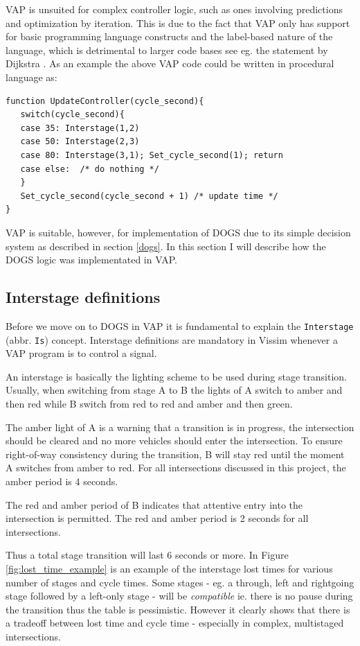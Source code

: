VAP is unsuited for complex controller logic, such as ones involving predictions and optimization by iteration. This is due to the fact that VAP only has support for basic programming language constructs and the label-based nature of the language, which is detrimental to larger code bases see eg. the statement by Dijkstra \cite{nogoto}. As an example the above VAP code could be written in procedural language as:

\begin{verbatim}
function UpdateController(cycle_second){
   switch(cycle_second){
   case 35: Interstage(1,2)
   case 50: Interstage(2,3)
   case 80: Interstage(3,1); Set_cycle_second(1); return
   case else:  /* do nothing */
   }
   Set_cycle_second(cycle_second + 1) /* update time */
}
\end{verbatim}

VAP is suitable, however, for implementation of DOGS due to its simple decision system as described in section \ref{dogs}. In this section I will describe how the DOGS logic was implementated in VAP.

\subsection{Interstage definitions}
Before we move on to DOGS in VAP it is fundamental to explain the \verb|Interstage| (abbr. \verb|Is|) concept. Interstage definitions are mandatory in Vissim whenever a VAP program is to control a signal.

An interstage is basically the lighting scheme to be used during stage transition. Usually, when switching from stage A to B the lights of A switch to amber and then red while B switch from red to red and amber and then green.

The amber light of A is a warning that a transition is in progress, the intersection should be cleared and no more vehicles should enter the intersection. To ensure right-of-way consistency during the transition, B will stay red until the moment A switches from amber to red. For all intersections discussed in this project, the amber period is 4 seconds.

The red and amber period of B indicates that attentive entry into the intersection is permitted. The red and amber period is 2 seconds for all intersections.

Thus a total stage transition will last 6 seconds or more. In Figure \ref{fig:lost_time_example} is an example of the interstage lost times for various number of stages and cycle times. Some stages - eg. a through, left and rightgoing stage followed by a left-only stage - will be \textit{compatible} ie. there is no pause during the transition thus the table is pessimistic. However it clearly shows that there is a tradeoff between lost time and cycle time - especially in complex, multistaged intersections.

